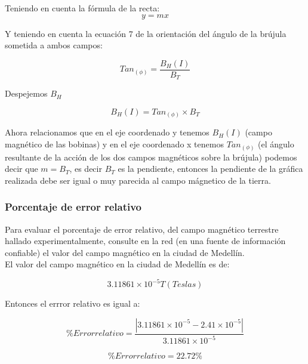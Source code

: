 Teniendo en cuenta la fórmula de la recta:
\[ y = mx\]

Y teniendo en cuenta la ecuación 7 de la orientación del ángulo de la brújula
sometida a ambos campos:

\[ Tan_{(\phi)} = \frac{B_{H}(I)}{B_{T}} \]

Despejemos $B_{H}$

\[ B_{H}(I) = Tan_{(\phi)} \times B_{T} \]

Ahora relacionamos que en el eje coordenado y tenemos $B_{H}(I)$ (campo
magnético de las bobinas) y en el eje coordenado x tenemos $Tan_{(\phi)}$ (el
ángulo resultante de la acción de los dos campos magnéticos sobre la brújula)
podemos decir que $m = B_{T}$, es decir $B_{T}$ es la pendiente, entonces la
pendiente de la gráfica realizada debe ser igual o muy parecida al campo
mágnetico de la tierra.


\subsubsection{Porcentaje de error relativo}
Para evaluar el porcentaje de error relativo, del campo magnético terrestre
hallado experimentalmente, consulte en la red (en una fuente de información
confiable) el valor del campo magnético en la ciudad de Medellín.\\

El valor del campo magnético en la ciudad de Medellín es de:

\[ 3.11861\times10^{-5} T (Teslas)\]

Entonces el errror relativo es igual a:

\[ \%Error relativo = \frac{|3.11861\times10^{-5} - 2.41\times10^{-5}|}{3.11861\times10^{-5}}\]

\[ \%Error relativo = 22.72\%\]
